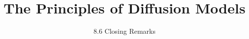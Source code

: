 ﻿%

\graphicspath{{../images/}}
\title{The Principles of Diffusion Models}
\subtitle{8.6 Closing Remarks}


\begin{frame}
    \titlepage
\end{frame}



